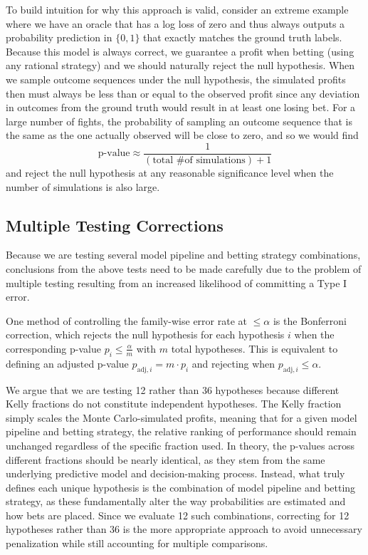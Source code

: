 \documentclass[12pt,twoside]{report}
\begin{document}
To build intuition for why this approach is valid, consider an extreme example where we have an oracle that has a log loss of zero and thus always outputs a probability prediction in $\{0, 1\}$ that exactly matches the ground truth labels. Because this model is always correct, we guarantee a profit when betting (using any rational strategy) and we should naturally reject the null hypothesis. When we sample outcome sequences under the null hypothesis, the simulated profits then must always be less than or equal to the observed profit since any deviation in outcomes from the ground truth would result in at least one losing bet. For a large number of fights, the probability of sampling an outcome sequence that is the same as the one actually observed will be close to zero, and so we would find
$$\text{p-value} \approx \frac{1}{(\text{total \# of simulations}) + 1}$$
and reject the null hypothesis at any reasonable significance level when the number of simulations is also large.


\subsection{Multiple Testing Corrections}

Because we are testing several model pipeline and betting strategy combinations, conclusions from the above tests need to be made carefully due to the problem of multiple testing resulting from an increased likelihood of committing a Type I error.

One method of controlling the family-wise error rate at $\leq \alpha$ is the Bonferroni correction, which rejects the null hypothesis for each hypothesis $i$ when the corresponding p-value $p_i \leq \frac{\alpha}{m}$ with $m$ total hypotheses. This is equivalent to defining an adjusted p-value $p_{\text{adj}, i} = m \cdot p_{i}$ and rejecting when $p_{\text{adj}, i} \leq \alpha$.

We argue that we are testing 12 rather than 36 hypotheses because different Kelly fractions do not constitute independent hypotheses. The Kelly fraction simply scales the Monte Carlo-simulated profits, meaning that for a given model pipeline and betting strategy, the relative ranking of performance should remain unchanged regardless of the specific fraction used. In theory, the p-values across different fractions should be nearly identical, as they stem from the same underlying predictive model and decision-making process. Instead, what truly defines each unique hypothesis is the combination of model pipeline and betting strategy, as these fundamentally alter the way probabilities are estimated and how bets are placed. Since we evaluate 12 such combinations, correcting for 12 hypotheses rather than 36 is the more appropriate approach to avoid unnecessary penalization while still accounting for multiple comparisons.
\end{document}
